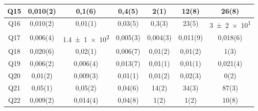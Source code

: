 \documentclass[12pt, letter paper]{report}
\begin{document}
\begin{table}[H]
\begin{tabular}{| c | c | c | c | c | c | c |}
          Q15 & 0,010(2) & 0,1(6)         & 0,4(5)         & 2(1)           & 12(8)          & 26(8)           \\ \hline
          Q16 & 0,010(2) & 0,01(1)        & 0,03(5)        & 0,3(3)         & 23(5)          & \num{3(2)e1}    \\ \hline
          Q17 & 0,006(4) & \num{1,4(1)e2} & 0,005(3)       & 0,004(3)       & 0,011(9)       & 0,018(6)        \\ \hline
          Q18 & 0,020(6) & 0,02(1)        & 0,006(7)       & 0,01(2)        & 0,01(2)        & 1(3)            \\ \hline
          Q19 & 0,006(2) & 0,006(4)       & 0,013(7)       & 0,01(1)        & 0,01(1)        & 0,021(4)        \\ \hline
          Q20 & 0,01(2)  & 0,009(3)       & 0,01(1)        & 0,01(2)        & 0,02(3)        & 0(2)            \\ \hline
          Q21 & 0,05(1)  & 0,05(2)        & 0,04(6)        & 14(2)          & 34(3)          & 87(3)           \\ \hline
          Q22 & 0,009(2) & 0,014(4)       & 0,04(8)        & 1(2)           & 1(2)           & 10(8)           \\ \hline
        \end{tabular}
      \end{table}
\end{document}
